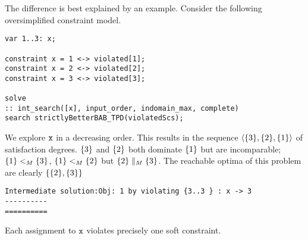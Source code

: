 The difference is best explained by an example. Consider the following oversimplified constraint model.
\begin{lstlisting}
var 1..3: x; 

constraint x = 1 <-> violated[1];
constraint x = 2 <-> violated[2];
constraint x = 3 <-> violated[3];

solve 
:: int_search([x], input_order, indomain_max, complete)
search strictlyBetterBAB_TPD(violatedScs);
\end{lstlisting}
We explore $\mathtt{x}$ in a decreasing order. This 
results in the sequence $\langle  \{3\}, \{2\}, \{1\}  \rangle$ of 
satisfaction degrees. $\{ 3 \}$ and $\{ 2 \}$ both 
dominate $\{ 1 \}$ but are incomparable; $\{ 1 \} <_M \{ 3 \}$,
$\{ 1 \} <_M \{ 2 \}$ but $\{ 2 \} \parallel_M \{ 3 \}$. The reachable optima
of this problem are clearly $\{  \{ 2 \}, \{ 3 \}  \}$
\begin{verbatim}
Intermediate solution:Obj: 1 by violating {3..3 } : x -> 3
----------
==========
\end{verbatim}
Each assignment to $\mathtt{x}$ violates precisely one soft constraint. 